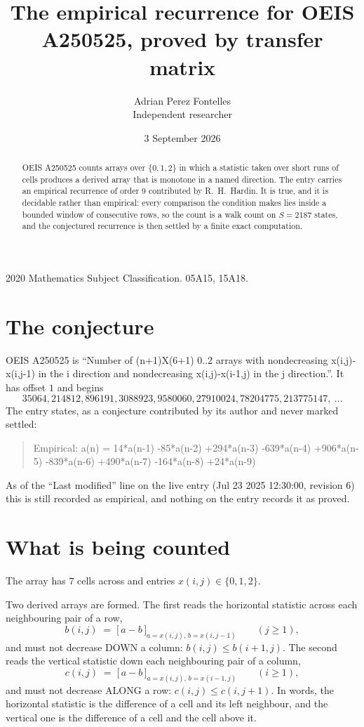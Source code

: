\documentclass[11pt,a4paper]{article}
\title{The empirical recurrence for OEIS A250525, proved by transfer matrix}
\author{Adrian Perez Fontelles\\ \small Independent researcher}
\date{3 September 2026}
\theoremstyle{plain}
\theoremstyle{definition}
\begin{document}
\maketitle

\begin{abstract}
OEIS A250525 counts arrays over $\{0,1,2\}$ in which a statistic taken over short runs
of cells produces a derived array that is monotone in a named direction. The entry carries an
empirical recurrence of order $9$ contributed by R.~H.~Hardin. It is true, and it is
decidable rather than empirical: every comparison the condition makes lies inside a bounded
window of consecutive rows, so the count is a walk count on $S=2187$ states, and the
conjectured recurrence is then settled by a finite exact computation.
\end{abstract}

\noindent\small 2020 Mathematics Subject Classification. 05A15, 15A18.\normalsize

\section{The conjecture}

OEIS A250525 is ``Number of (n+1)X(6+1) 0..2 arrays with nondecreasing x(i,j)-x(i,j-1) in the i direction and nondecreasing x(i,j)-x(i-1,j) in the j direction.''. It has offset $1$ and begins
\[
35064, 214812, 896191, 3088923, 9580060, 27910024, 78204775, 213775147,\ \dots
\]
The entry states, as a conjecture contributed by its author and never marked settled:
\begin{quote}
Empirical: a(n) = 14*a(n-1) -85*a(n-2) +294*a(n-3) -639*a(n-4) +906*a(n-5) -839*a(n-6) +490*a(n-7) -164*a(n-8) +24*a(n-9)
\end{quote}
As of the ``Last modified'' line on the live entry (Jul 23 2025 12:30:00, revision 6) this is still
recorded as empirical, and nothing on the entry records it as proved.

\section{What is being counted}

The array has $7$ cells across and entries $x(i,j)\in\{0,1,2\}$.

Two derived arrays are formed. The first reads the horizontal statistic across each
neighbouring pair of a row,
\[
b(i,j)\;=\;\bigl[\,a-b\,\bigr]_{a=x(i,j),\,b=x(i,j-1)}\qquad (j\ge1),
\]
and must not decrease DOWN a column: $b(i,j)\le b(i{+}1,j)$. The second reads the vertical
statistic down each neighbouring pair of a column,
\[
c(i,j)\;=\;\bigl[\,a-b\,\bigr]_{a=x(i,j),\,b=x(i{-}1,j)}\qquad (i\ge1),
\]
and must not decrease ALONG a row: $c(i,j)\le c(i,j{+}1)$. In words, the horizontal statistic
is the difference of a cell and its left neighbour, and the vertical one is
the difference of a cell and the cell above it.
\end{document}
